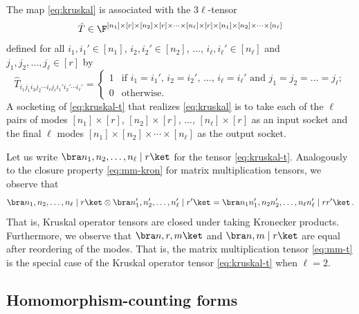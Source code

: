 The map \eqref{eq:kruskal} is associated with the $3\ell$-tensor
\[
\hat{T}\in\F^{%
[n_1]\times [r]\times
[n_2]\times [r]\times
\cdots \times
[n_\ell]\times [r]\times
[n_1]\times [n_2]\times\cdots\times [n_\ell]}
\]
defined for all
$i_1,i_1'\in [n_1]$,
$i_2,i_2'\in [n_2]$,
$\ldots$,
$i_\ell,i_\ell'\in [n_\ell]$
and
$j_1,j_2,\ldots,j_\ell\in [r]$
by
\begin{equation}
\label{eq:kruskal-t}
\hat{T}_{i_1j_1i_2j_2\cdots i_\ell j_\ell i_1'i_2'\cdots i_\ell'}=
\begin{cases}
1 & \text{if $i_1=i_1'$, $i_2=i_2'$, $\ldots$, $i_\ell=i_\ell'$ and $j_1=j_2=\ldots=j_\ell$};\\
0 & \text{otherwise}.
\end{cases}
\end{equation}
A socketing of \eqref{eq:kruskal-t} that realizes \eqref{eq:kruskal}
is to take each of the $\ell$ pairs of modes
$[n_1]\times[r]$, $[n_2]\times[r]$, $\ldots$, $[n_\ell]\times [r]$
as an input socket and the final $\ell$ modes
$[n_1]\times [n_2]\times\cdots\times[n_\ell]$ as the output socket.

%
%
Let us write $\bra n_1,n_2,\ldots,n_\ell \mid r\ket$ for the tensor
%
\eqref{eq:kruskal-t}. Analogously to the closure property \eqref{eq:mm-kron}
for matrix multiplication tensors, we observe that
\begin{equation}
\label{eq:kruskal-kron}
%
%
%
\bra n_1,n_2,\ldots,n_\ell\mid r\ket
\otimes
%
%
\bra n_1',n_2',\ldots,n_\ell' \mid r'\ket
%
=
%
%
\bra n_1n_1',n_2n_2',\ldots,n_\ell n_\ell' \mid rr'\ket\,.
%
\end{equation}
That is, Kruskal operator tensors are closed under taking Kronecker products.
Furthermore, we observe that $\bra n,r,m\ket$ and %
%
$\bra n,m \mid r\ket$ are equal after
%
 reordering of the modes. That is, the
matrix multiplication tensor \eqref{eq:mm-t} is the special case
of the Kruskal operator tensor \eqref{eq:kruskal-t} when $\ell=2$.


\subsection{Homomorphism-counting forms}

\label{sect:binom}

